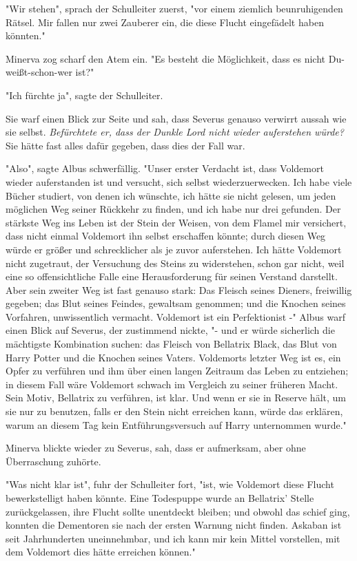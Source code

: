 {"Wir stehen", sprach der Schulleiter zuerst, "vor einem ziemlich beunruhigenden Rätsel. Mir fallen nur zwei Zauberer ein, die diese Flucht eingefädelt haben könnten."

Minerva zog scharf den Atem ein. "Es besteht die Möglichkeit, dass es nicht Du-weißt-schon-wer ist?"

"Ich fürchte ja", sagte der Schulleiter.

Sie warf einen Blick zur Seite und sah, dass Severus genauso verwirrt aussah wie sie selbst. \emph{Befürchtete er, dass der Dunkle Lord nicht wieder auferstehen würde?} Sie hätte fast alles dafür gegeben, dass dies der Fall war.

"Also", sagte Albus schwerfällig. "Unser erster Verdacht ist, dass Voldemort wieder auferstanden ist und versucht, sich selbst wiederzuerwecken. Ich habe viele Bücher studiert, von denen ich wünschte, ich hätte sie nicht gelesen, um jeden möglichen Weg seiner Rückkehr zu finden, und ich habe nur drei gefunden. Der stärkste Weg ins Leben ist der Stein der Weisen, von dem Flamel mir versichert, dass nicht einmal Voldemort ihn selbst erschaffen könnte; durch diesen Weg würde er größer und schrecklicher als je zuvor auferstehen. Ich hätte Voldemort nicht zugetraut, der Versuchung des Steins zu widerstehen, schon gar nicht, weil eine so offensichtliche Falle eine Herausforderung für seinen Verstand darstellt. Aber sein zweiter Weg ist fast genauso stark: Das Fleisch seines Dieners, freiwillig gegeben; das Blut seines Feindes, gewaltsam genommen; und die Knochen seines Vorfahren, unwissentlich vermacht. Voldemort ist ein Perfektionist -" Albus warf einen Blick auf Severus, der zustimmend nickte, "- und er würde sicherlich die mächtigste Kombination suchen: das Fleisch von Bellatrix Black, das Blut von Harry Potter und die Knochen seines Vaters. Voldemorts letzter Weg ist es, ein Opfer zu verführen und ihm über einen langen Zeitraum das Leben zu entziehen; in diesem Fall wäre Voldemort schwach im Vergleich zu seiner früheren Macht. Sein Motiv, Bellatrix zu verführen, ist klar. Und wenn er sie in Reserve hält, um sie nur zu benutzen, falls er den Stein nicht erreichen kann, würde das erklären, warum an diesem Tag kein Entführungsversuch auf Harry unternommen wurde."

Minerva blickte wieder zu Severus, sah, dass er aufmerksam, aber ohne Überraschung zuhörte.

"Was nicht klar ist", fuhr der Schulleiter fort, "ist, wie Voldemort diese Flucht bewerkstelligt haben könnte. Eine Todespuppe wurde an Bellatrix' Stelle zurückgelassen, ihre Flucht sollte unentdeckt bleiben; und obwohl das schief ging, konnten die Dementoren sie nach der ersten Warnung nicht finden. Askaban ist seit Jahrhunderten uneinnehmbar, und ich kann mir kein Mittel vorstellen, mit dem Voldemort dies hätte erreichen können."

}
